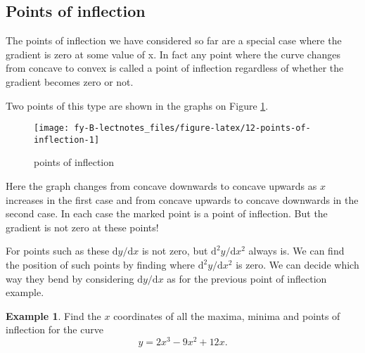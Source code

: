 \documentclass[
  english,
  11pt,
  oneside]{book}
\newcommand{\slide}{}
\theoremstyle{definition}
\theoremstyle{definition}
\newtheorem{example}{Example}[chapter]
\theoremstyle{definition}
\theoremstyle{definition}
\theoremstyle{remark}
\begin{document}
\slide

\subsection{Points of inflection}\label{points-of-inflection-1}

The points of inflection we have considered so far are a special case where the gradient is zero at
some value of x. In fact any point where the curve changes from concave to convex is called a
point of inflection regardless of whether the gradient becomes zero or not.

\slide

Two points of this type
are shown in the graphs on Figure \ref{fig:12-points-of-inflection}.

\begin{figure}

{\centering \texttt{[image: fy-B-lectnotes\_files/figure-latex/12-points-of-inflection-1]} 

}

\caption{points of inflection}\label{fig:12-points-of-inflection}
\end{figure}

Here the graph changes from concave downwards to concave upwards as \(x\) increases in the first case and from concave upwards to concave downwards in the second case. In each case the marked point is a point of inflection. But the gradient is not zero at these points!

\slide

For points such as these \(\mathrm{d}y/\mathrm{d} x\) is not zero, but \(\mathrm{d}^{2}y/\mathrm{d} x^2\) always is. We can find the position of such points by finding where \(\mathrm{d}^{2}y/\mathrm{d} x^2\) is zero. We can decide which way they bend by considering \(\mathrm{d}y/\mathrm{d} x\) as for the previous point of inflection example.
\slide

\begin{example}
Find the \(x\) coordinates of all the maxima, minima and points of inflection for the curve
\[
y = 2x^3-9x^2+12x.
\]
\end{example}
\end{document}
